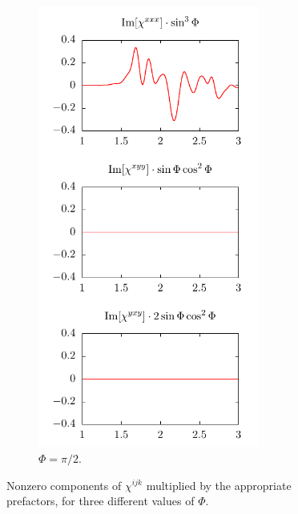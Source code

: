\documentclass[aps,prb,10pt,letterpaper,notitlepage]{revtex4-1}
\begin{document}
\begin{figure}[b]
\begin{subfigure}[b]{0.25\textwidth}
        \includegraphics[width=0.8\textwidth]{rot/comps90.pdf}
        \caption{$\Phi = \pi/2$.}
    \end{subfigure}
    \caption{Nonzero components of $\chi^{ijk}$ multiplied by the appropriate
    prefactors, for three different values of $\Phi$.}
    \label{fig:comps}
\end{figure}
\end{document}
